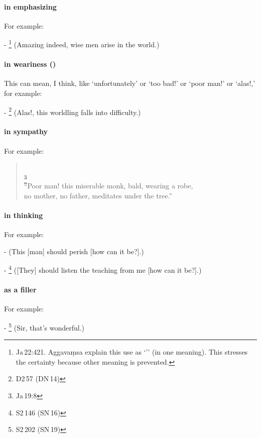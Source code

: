 \paragraph*{ in emphasizing} For example:\par
- \footnote{Ja\,22:421. Aggava\d msa explain this use as `'' (in one meaning). This stresses the certainty because other meaning is prevented.} (Amazing indeed, wise men arise in the world.) \par
\paragraph*{ in weariness ()} This can mean, I think, like `unfortunately' or `too bad!' or `poor man!' or `alas!,' for example:\par
- \footnote{D2\,57 (DN\,14)} (Alas!, this worldling falls into difficulty.) \par
\paragraph*{ in sympathy} For example:\par
\begin{quote}
\\
\footnote{Ja\,19:8}\\[1.5mm]
``Poor man! this miserable monk, bald, wearing a robe,\\
no mother, no father, meditates under the tree.''
\end{quote}
\paragraph*{ in thinking} For example:\par
-  (This [man] should perish [how can it be?].) \par
- \footnote{S2\,146 (SN\,16)} ([They] should listen the teaching from me [how can it be?].) \par
\paragraph*{ as a filler} For example:\par
- \footnote{S2\,202 (SN\,19)} (Sir, that's wonderful.) \par

